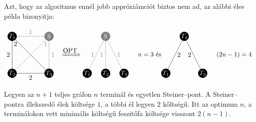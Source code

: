 Azt, hogy az algoritmus ennél jobb appróxiámciót biztos nem ad, az alábbi éles
példa bizonyitja:

\[
\parbox[l]{3cm}{
\begin{tikzpicture}[scale=1]
  \tikzset{ p/.style={circle,white,fill=gray,inner sep=0pt,minimum size=0.5cm},
  }
  \node[p,fill=black] (T1) at (-1,  1) {$T_1$};
  \node[p,fill=black] (T2) at (-1, -1) {$T_2$}; 
  \node[p,fill=black] (T3) at (+1 , -1) {$T_3$};
  \node[p] (S) at (+1 , 1) {S};
  
  \draw[-] (T1) -- (T3) node [at start, below] {$2$}; 
  \draw[-] (T1) -- (T2) node [midway, left] {$2$}; 
  \draw[-] (T2) -- (T3) node [midway, below] {$2$};
  
  \draw[-,gray] (T1) -- (S) node [midway, above] {$1$}; 
  \draw[-,gray] (T2) -- (S) node [at end, below] {$1$}; 
  \draw[-,gray] (T3) -- (S) node [midway, right] {$1$};
\end{tikzpicture}
}
\xRightarrow{\mbox{OPT}}
\parbox[l]{3cm}{
\begin{tikzpicture}[scale=1]
  \tikzset{ p/.style={circle,white,fill=gray,inner sep=0pt,minimum size=0.5cm},
  }
  \node[p,fill=black] (T1) at (-1,  0) {$T_1$};
  \node[p,fill=black] (T2) at (0, 0) {$T_2$}; 
  \node[p,fill=black] (T3) at (+1 , 0) {$T_3$};
  \node[p] (S) at (0 , 2) {S};
  
  \draw[-,gray] (T1) -- (S) node [midway, left] {$1$}; 
  \draw[-,gray] (T2) -- (S) node [midway, left] {$1$}; 
  \draw[-,gray] (T3) -- (S) node [midway, right] {$1$};
\end{tikzpicture}
}
n=3 \mbox{ és}
\parbox[l]{3cm}{
\begin{tikzpicture}[scale=1]
  \tikzset{ p/.style={circle,white,fill=gray,inner sep=0pt,minimum size=0.5cm},
  }
  \node[p,fill=black] (T1) at (-1,  0) {$T_1$};
  \node[p,fill=black] (T2) at (0, 2) {$T_2$}; 
  \node[p,fill=black] (T3) at (+1 , 0) {$T_3$};
  
  \draw[-] (T1) -- (T2) node [midway, right] {$2$}; 
  \draw[-] (T2) -- (T3) node [midway, left] {$2$};  
\end{tikzpicture}
}(2n-1)=4
\]

Legyen az $n+1$ teljes gráfon $n$ terminál és egyetlen Steiner--pont. A
Steiner--pontra illekszedő élek költsége $1$, a többi él legyen $2$ kőltségű. 
Itt az optimum $n$, a terminálokon vett minimális költségű feszitőfa költsége
visszont $2(n-1)$.